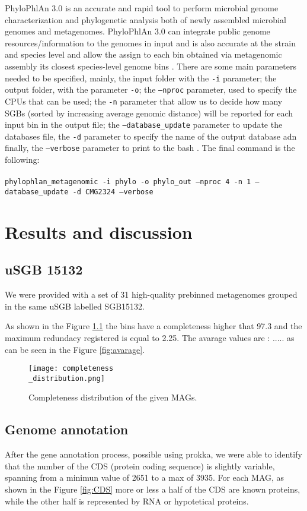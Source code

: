 \documentclass[a4paper,titlepage]{book}
\newcommand{\code}[1]{\colorbox{light-gray}{\texttt{#1}}}
\begin{document}
PhyloPhlAn 3.0 is an accurate and rapid tool to perform microbial genome characterization and phylogenetic analysis both of newly assembled microbial genomes and metagenomes. PhyloPhlAn 3.0 can integrate public genome resources/information to the genomes in input and is also accurate at the strain and species level and allow the assign to each bin obtained via metagenomic assembly its closest species-level genome bins \cite{Phylo}.
There are some main parameters needed to be specified, mainly, the input folder with the \code{-i} parameter; the output folder, with the parameter \code{-o}; the \code{--nproc} parameter, used to specify the CPUs that can be used; the \code{-n} parameter that allow us to decide  how many SGBs (sorted by increasing average genomic distance) will be reported for each input bin in the output file; the \code{--database\_update} parameter to update the databases file, the \code{-d} parameter to specify the name of the output database adn finally, the \code{--verbose} parameter to print to the bash \cite{PhyloGuide}.
The final command is the following:\\ \newline \\ \code{phylophlan\_metagenomic -i phylo -o phylo\_out --nproc 4 -n 1 --database\_update -d CMG2324 --verbose}

\chapter{Results and discussion}

\section{uSGB 15132}

We were provided with a set of 31 high-quality prebinned metagenomes grouped in the same uSGB labelled SGB15132.

As shown in the Figure \ref{fig:compl} the bins have a completeness higher that 97.3 and the maximum redundacy registered is equal to 2.25.
The avarage values are : ..... as can be seen in the Figure \ref{fig:avarage}.

\begin{figure}[ht]
\centering
\texttt{[image: completeness\\\_distribution.png]}
\caption{Completeness distribution of the given MAGs.}
\label{fig:compl}
\end{figure}

\section{Genome annotation}
After the gene annotation process, possible using prokka, we were able to identify that the number of the CDS (protein coding sequence) is slightly variable, spanning from a minimun value of 2651 to a max of 3935. For each MAG, as shown in the Figure \ref{fig:CDS} more or less a half of the CDS are known proteins, while the other half is represented by RNA or hypotetical proteins.
\end{document}
